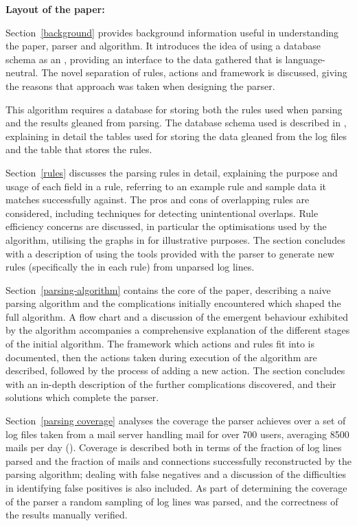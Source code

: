 \vspace{1em}\noindent\textbf{Layout of the paper:}

Section~\ref{background} provides background information useful in
understanding the paper, parser and algorithm.  It introduces the idea of
using a database schema as an \API{}, providing an interface to the data
gathered that is language-neutral.  The novel separation of rules, actions
and framework is discussed, giving the reasons that approach was taken when
designing the parser.

This algorithm requires a database for storing both the rules used when
parsing and the results gleaned from parsing.  The database schema used is
described in , explaining in detail the tables
used for storing the data gleaned from the log files and the table that
stores the rules.

Section~\ref{rules} discusses the parsing rules in detail, explaining the
purpose and usage of each field in a rule, referring to an example rule and
sample data it matches successfully against.  The pros and cons of
overlapping rules are considered, including techniques for detecting
unintentional overlaps.  Rule efficiency concerns are discussed, in
particular the optimisations used by the algorithm, utilising the graphs in
 for illustrative purposes.  The section concludes with
a description of using the tools provided with the parser to generate new
rules (specifically the \regex{} in each rule) from unparsed log lines.

Section~\ref{parsing-algorithm} contains the core of the paper, describing
a naive parsing algorithm and the complications initially encountered which
shaped the full algorithm.  A flow chart and a discussion of the emergent
behaviour exhibited by the algorithm accompanies a comprehensive
explanation of the different stages of the initial algorithm.  The
framework which actions and rules fit into is documented, then the actions
taken during execution of the algorithm are described, followed by the
process of adding a new action.  The section concludes with an in-depth
description of the further complications discovered, and their solutions
which complete the parser.

Section~\ref{parsing coverage} analyses the coverage the parser achieves
over a set of \numberOFlogFILES{} log files taken from a mail server
handling mail for over 700 users, averaging 8500 mails per day
().  Coverage is described both
in terms of the fraction of log lines parsed and the fraction of mails and
connections successfully reconstructed by the parsing algorithm; dealing
with false negatives and a discussion of the difficulties in identifying
false positives is also included.  As part of determining the coverage of
the parser a random sampling of log lines was parsed, and the correctness
of the results manually verified.

